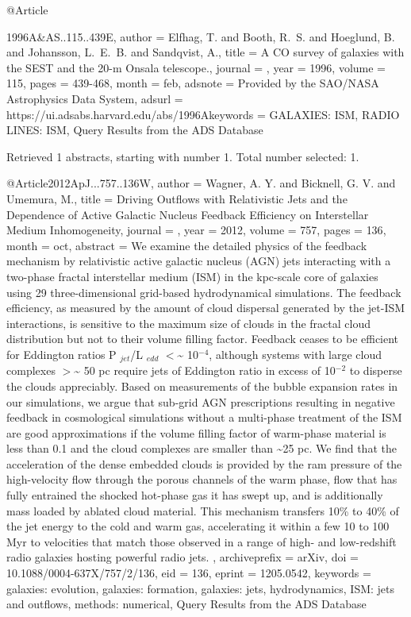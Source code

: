 \documentclass[longauth]{aa}
\begin{document}
{{{{{{@Article{1996A&AS..115..439E,
  author   = {{Elfhag}, T. and {Booth}, R.~S. and {Hoeglund}, B. and {Johansson}, L.~E.~B. and {Sandqvist}, A.},
  title    = {A CO survey of galaxies with the SEST and the 20-m Onsala telescope.},
  journal  = {\aaps},
  year     = {1996},
  volume   = {115},
  pages    = {439-468},
  month    = feb,
  adsnote  = {Provided by the SAO/NASA Astrophysics Data System},
  adsurl   = {https://ui.adsabs.harvard.edu/abs/1996Akeywords = {GALAXIES: ISM, RADIO LINES: ISM},
}
Query Results from the ADS Database


Retrieved 1 abstracts, starting with number 1.  Total number selected: 1.

@Article{2012ApJ...757..136W,
  author        = {Wagner, A. Y. and Bicknell, G. V. and Umemura, M.},
  title         = {Driving Outflows with Relativistic Jets and the Dependence of Active Galactic Nucleus Feedback Efficiency on Interstellar Medium Inhomogeneity},
  journal       = {\apj},
  year          = {2012},
  volume        = {757},
  pages         = {136},
  month         = oct,
  abstract      = {We examine the detailed physics of the feedback mechanism by
relativistic active galactic nucleus (AGN) jets interacting with a
two-phase fractal interstellar medium (ISM) in the kpc-scale core of
galaxies using 29 three-dimensional grid-based hydrodynamical
simulations. The feedback efficiency, as measured by the amount of cloud
dispersal generated by the jet-ISM interactions, is sensitive to the
maximum size of clouds in the fractal cloud distribution but not to
their volume filling factor. Feedback ceases to be efficient for
Eddington ratios P $_{jet}$/L $_{edd}$ $\lt$\~{}
10$^{-4}$, although systems with large cloud complexes $\gt$\~{} 50 pc
require jets of Eddington ratio in excess of 10$^{-2}$ to disperse
the clouds appreciably. Based on measurements of the bubble expansion
rates in our simulations, we argue that sub-grid AGN prescriptions
resulting in negative feedback in cosmological simulations without a
multi-phase treatment of the ISM are good approximations if the volume
filling factor of warm-phase material is less than 0.1 and the cloud
complexes are smaller than \~{}25 pc. We find that the acceleration of the
dense embedded clouds is provided by the ram pressure of the
high-velocity flow through the porous channels of the warm phase, flow
that has fully entrained the shocked hot-phase gas it has swept up, and
is additionally mass loaded by ablated cloud material. This mechanism
transfers 10\% to 40\% of the jet energy to the cold and warm gas,
accelerating it within a few 10 to 100 Myr to velocities that match
those observed in a range of high- and low-redshift radio galaxies
hosting powerful radio jets.
},
  archiveprefix = {arXiv},
  doi           = {10.1088/0004-637X/757/2/136},
  eid           = {136},
  eprint        = {1205.0542},
  keywords      = {galaxies: evolution, galaxies: formation, galaxies: jets, hydrodynamics, ISM: jets and outflows, methods: numerical},
}
Query Results from the ADS Database


}}}}}}}
\end{document}
